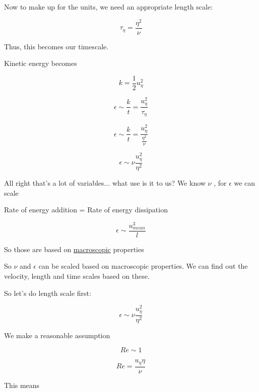 \documentclass[12pt]{article}
\renewcommand{\_}{\kern-1.5pt\textunderscore\kern-1.5pt}
\begin{document}
\begin{itemize}
Now to make up for the units, we need an appropriate length scale:\par

 \[  \tau_{ \eta }=\frac{ \eta ^{2}}{ \nu } \] \par

Thus, this becomes our timescale.\par

Kinetic energy becomes\par

 \[ k=\frac{1}{2}u_{ \eta }^{2} \] \par

 \[  \epsilon  \sim \frac{k}{t}=\frac{u_{ \eta }^{2}}{ \tau_{ \eta }} \] \par

 \[  \epsilon  \sim \frac{k}{t}=\frac{u_{ \eta }^{2}}{\frac{ \eta ^{2}}{ \nu }} \] \par

 \[  \epsilon  \sim  \nu \frac{u_{ \eta }^{2}}{ \eta ^{2}} \] \par

All right that’s a lot of variables$ \ldots $  what use is it to us? We know  \(  \nu  \)  , for  \(  \epsilon  \)  we can scale\par

Rate of energy addition = Rate of energy dissipation\par

 \[  \epsilon  \sim \frac{u_{mean}^{3}}{l} \] \par

So those are based on \uline{macroscopic} properties\par

So  \(  \nu  \)  and  \(  \epsilon  \)  can be scaled based on macroscopic properties. We can find out the velocity, length and time scales based on these.\par

So let’s do length scale first:\par

 \[  \epsilon  \sim  \nu \frac{u_{ \eta }^{2}}{ \eta ^{2}} \] \par

We make a reasonable assumption\par

 \[ Re \sim 1 \] \par

 \[ Re=\frac{u_{ \eta } \eta }{ \nu } \] \par

This means\par


\end{itemize}
\end{document}
